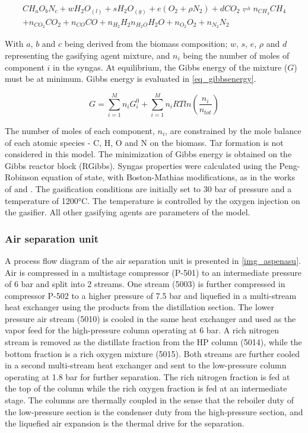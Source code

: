 \documentclass[a4paper, titlepage]{article}
\begin{document}
\begin{multline}
    CH_aO_bN_c + wH_2O_{(l)} + sH_2O_{(g)} + e(O_2+\rho N_2) + dCO_2 \rightleftharpoons n_{CH_4}CH_4 \\
    + n_{CO_2}CO_2 + n_{CO}CO + n_{H_2}H_2 n_{H_2O}H_2O + n_{O_2}O_2 + n_{N_2}N_2
    \label{eq_globalgasification}
\end{multline}

With $a$, $b$ and $c$ being derived from the biomass composition; $w$, $s$, $e$, $\rho$ and $d$ representing the
gasifying agent mixture, and $n_i$ being the number of moles of component $i$ in the syngas. At equilibrium, the Gibbs
energy of the mixture ($G$) must be at minimum. Gibbs energy is evaluated in \autoref{eq_gibbsenergy}.

\begin{equation}
    G = \sum_{i=1}^{M}{n_iG_i^0} + \sum_{i=1}^{M}{n_iRT ln \left( \frac{n_i}{n_{tot}} \right) }
    \label{eq_gibbsenergy}
\end{equation}

The number of moles of each component, $n_i$, are constrained by the mole balance of each atomic species - C, H, O and N on the
biomass. Tar formation is not considered in this model. The minimization of Gibbs energy is obtained on the Gibbs
reactor block (RGibbs). Syngas properties were calculated using the Peng-Robinson equation of state,
with Boston-Mathias modifications, as in the works of \textcite{ramzanSimulationHybridBiomass2011} and
\textcite{dohertyAspenSimulationBiomass2013}. The gasification conditions are initially set to 30 bar of pressure and a
temperature of 1200°C.  The temperature is controlled by the oxygen injection on the gasifier. All other gasifying
agents are parameters of the model.

\subsubsection{Air separation unit}

A process flow diagram of the air separation unit is presented in \autoref{img_aspenasu}.
Air is compressed in a multistage compressor (P-501) to an intermediate pressure of 6 bar and split into 2 streams.
One stream (5003) is further compressed in compressor P-502 to a higher pressure of 7.5 bar and liquefied in a
multi-stream heat exchanger using the products from the distillation section.
The lower pressure air stream (5010) is cooled in the same heat exchanger and used as the vapor feed for the
high-pressure column operating at 6 bar.
A rich nitrogen stream is removed as the distillate fraction from the HP column (5014), while the bottom fraction is
a rich oxygen mixture (5015).
Both streams are further cooled in a second multi-stream heat exchanger and sent to the low-pressure column operating
at 1.8 bar for further separation. The rich nitrogen fraction is fed at the top of the column while the rich oxygen
fraction is fed at an intermediate stage. The columns are thermally coupled in the sense that the reboiler duty of the
low-pressure section is the condenser duty from the high-pressure section, and the liquefied air expansion is the
thermal drive for the separation.
\end{document}
